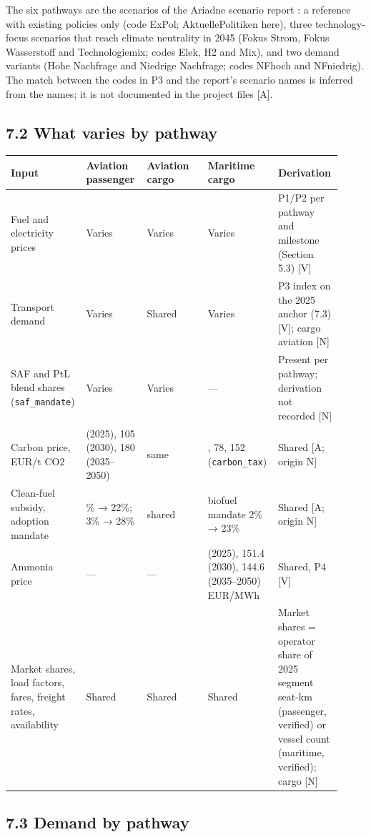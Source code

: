 \documentclass[11pt,a4paper]{article}
\begin{document}
The six pathways are the scenarios of the Ariadne scenario report \citep{luderer2025}: a reference with existing policies only (code ExPol; AktuellePolitiken here), three technology-focus scenarios that reach climate neutrality in 2045 (Fokus Strom, Fokus Wasserstoff and Technologiemix; codes Elek, H2 and Mix), and two demand variants (Hohe Nachfrage and Niedrige Nachfrage; codes NFhoch and NFniedrig). The match between the codes in P3 and the report's scenario names is inferred from the names; it is not documented in the project files [A].

\subsection*{7.2 What varies by pathway}

{\footnotesize\setlength{\tabcolsep}{3pt}
\begin{longtable}{>{\raggedright\arraybackslash}p{0.184\linewidth}>{\raggedright\arraybackslash}p{0.184\linewidth}>{\raggedright\arraybackslash}p{0.184\linewidth}>{\raggedright\arraybackslash}p{0.184\linewidth}>{\raggedright\arraybackslash}p{0.184\linewidth}}
\toprule
\textbf{Input} & \textbf{Aviation passenger} & \textbf{Aviation cargo} & \textbf{Maritime cargo} & \textbf{Derivation} \tabularnewline
\midrule
\endhead
Fuel and electricity prices & Varies & Varies & Varies & P1/P2 per pathway and milestone (Section 5.3) [V] \tabularnewline
Transport demand & Varies & Shared & Varies & P3 index on the 2025 anchor (7.3) [V]; cargo aviation [N] \tabularnewline
SAF and PtL blend shares (\texttt{saf\_\allowbreak{}mandate}) & Varies & Varies & — & Present per pathway; derivation not recorded [N] \tabularnewline
Carbon price, EUR/t CO2 & 35 (2025), 105 (2030), 180 (2035–2050) & same & 28, 78, 152 (\texttt{carbon\_\allowbreak{}tax}) & Shared [A; origin N] \tabularnewline
Clean-fuel subsidy, adoption mandate & 8\% → 22\%; 3\% → 28\% & shared & biofuel mandate 2\% → 23\% & Shared [A; origin N] \tabularnewline
Ammonia price & — & — & 176.4 (2025), 151.4 (2030), 144.6 (2035–2050) EUR/MWh & Shared, P4 [V] \tabularnewline
Market shares, load factors, fares, freight rates, availability & Shared & Shared & Shared & Market shares = operator share of 2025 segment seat-km (passenger, verified) or vessel count (maritime, verified); cargo [N] \tabularnewline
\bottomrule
\end{longtable}}

\subsection*{7.3 Demand by pathway}
\end{document}
